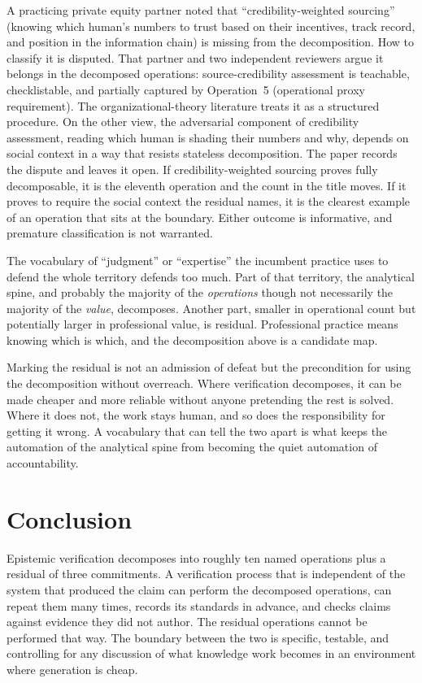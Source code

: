 \documentclass[
  11pt,
]{article}
\begin{document}
A practicing private equity partner noted that ``credibility-weighted
sourcing'' (knowing which human's numbers to trust based on their
incentives, track record, and position in the information chain) is
missing from the decomposition. How to classify it is disputed.
That partner and two independent reviewers argue it belongs in the
decomposed operations: source-credibility assessment is teachable,
checklistable, and partially captured by Operation~5 (operational proxy
requirement). The organizational-theory literature treats it as a
structured procedure. On the other view, the adversarial component of
credibility assessment, reading which human is shading their numbers
and why, depends on social context in a way that resists stateless
decomposition. The paper records the dispute and leaves it open. If
credibility-weighted sourcing proves fully decomposable, it is the
eleventh operation and the count in the title moves. If it proves to
require the social context the residual names, it is the clearest example
of an operation that sits at the boundary. Either outcome is informative,
and premature classification is not warranted.

The vocabulary of ``judgment'' or ``expertise'' the incumbent
practice uses to defend the whole territory defends too much. Part of that
territory, the analytical spine, and probably the majority of the
\emph{operations} though not necessarily the majority of the \emph{value}, decomposes. Another part, smaller in operational count but potentially
larger in professional value, is residual. Professional practice means
knowing which is which, and the decomposition above is a candidate map.

Marking the residual is not an admission of defeat but the precondition for
using the decomposition without overreach. Where verification decomposes,
it can be made cheaper and more reliable without anyone pretending the rest
is solved. Where it does not, the work stays human, and so does the
responsibility for getting it wrong. A vocabulary that can tell the two
apart is what keeps the automation of the analytical spine from becoming
the quiet automation of accountability.

\section{Conclusion}\label{conclusion}

Epistemic verification decomposes into roughly ten named operations plus
a residual of three commitments. A verification process that is
independent of the system that produced the claim can perform the
decomposed operations, can repeat them many times, records its standards
in advance, and checks claims against evidence they did not author. The
residual operations cannot be performed that way. The boundary between
the two is specific, testable, and controlling for any discussion
of what knowledge work becomes in an environment where generation is
cheap.
\end{document}
